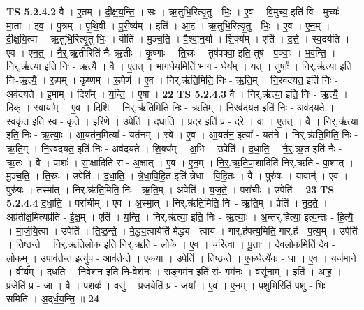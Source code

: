 \documentclass[17pt]{extarticle}
\begin{document}
                  \newline
                                \textbf{ TS 5.2.4.2} \newline
                  वै । ए॒तम् । दी॒क्ष॒य॒न्ति॒ । सः । ऋ॒तुभि॒रित्यृ॒तु - भिः॒ । ए॒व । वि॒मुच्य॒ इति॑ वि - मुच्यः॑ । मा॒ता । इ॒व॒ । पु॒त्रम् । पृ॒थि॒वी । पु॒री॒ष्य᳚म् । इति॑ । आ॒ह॒ । ऋ॒तुभि॒रित्यृ॒तु - भिः॒ । ए॒व । ए॒न॒म् । दी॒क्ष॒यि॒त्वा । ऋ॒तुभि॒रित्यृ॒तु-भिः॒ । वीति॑ । मु॒ञ्च॒ति॒ । वै॒श्वा॒न॒र्या । शि॒क्य᳚म् । एति॑ । द॒त्ते॒ । स्व॒दय॑ति । ए॒व । ए॒न॒त्॒ । नै॒र्॒.ऋ॒तीरिति॑ नैः-ऋ॒तीः । कृ॒ष्णाः । ति॒स्रः । तुष॑पक्वा॒ इति॒ तुष॑ - प॒क्वाः॒ । भ॒व॒न्ति॒ । निर्.ऋ॑त्या॒ इति॒ निः - ऋ॒त्यै॒ । वै । ए॒तत् । भा॒ग॒धेय॒मिति॑ भाग - धेय᳚म् । यत् । तुषाः᳚ । निर्.ऋ॑त्या॒ इति॒ निः-ऋ॒त्यै॒ । रू॒पम् । कृ॒ष्णम् । रू॒पेण॑ । ए॒व । निर्.ऋ॑ति॒मिति॒ निः - ऋ॒ति॒म् । नि॒रव॑दयत॒ इति॑ निः - अव॑दयते । इ॒माम् । दिश᳚म् । य॒न्ति॒ । ए॒षा । \textbf{  22} \newline
                  \newline
                                \textbf{ TS 5.2.4.3} \newline
                  वै । निर्.ऋ॑त्या॒ इति॒ निः - ऋ॒त्यै॒ । दिक् । स्वाया᳚म् । ए॒व । दि॒शि । निर्.ऋ॑ति॒मिति॒ निः - ऋ॒ति॒म् । नि॒रव॑दयत॒ इति॑ निः - अव॑दयते । स्वकृ॑त॒ इति॒ स्व - कृ॒ते॒ । इरि॑णे । उपेति॑ । द॒धा॒ति॒ । प्र॒द॒र इति॑ प्र - द॒रे । वा॒ । ए॒तत् । वै । निर्.ऋ॑त्या॒ इति॒ निः - ऋ॒त्याः॒ । आ॒यत॑न॒मित्या᳚ - यत॑नम् । स्वे । ए॒व । आ॒यत॑न॒ इत्या᳚ - यत॑ने । निर्.ऋ॑ति॒मिति॒ निः - ऋ॒ति॒म् । नि॒रव॑दयत॒ इति॑ निः - अव॑दयते । शि॒क्य᳚म् । अ॒भि । उपेति॑ । द॒धा॒ति॒ । नै॒र्॒.ऋ॒त इति॑ नैः - ऋ॒तः । वै । पाशः॑ । सा॒क्षादिति॑ स - अ॒क्षात् । ए॒व । ए॒न॒म् । नि॒र्॒.ऋ॒ति॒पा॒शादिति॑ निर्.ऋति - पा॒शात् । मु॒ञ्च॒ति॒ । ति॒स्रः । उपेति॑ । द॒धा॒ति॒ । त्रे॒धा॒वि॒हि॒त इति॑ त्रेधा - वि॒हि॒तः । वै । पुरु॑षः । यावान्॑ । ए॒व । पुरु॑षः । तस्मा᳚त् । निर्.ऋ॑ति॒मिति॒ निः - ऋ॒ति॒म् । अवेति॑ । य॒ज॒ते॒ । परा॑चीः । उपेति॑ । \textbf{  23} \newline
                  \newline
                                \textbf{ TS 5.2.4.4} \newline
                  द॒धा॒ति॒ । परा॑चीम् । ए॒व । अ॒स्मा॒त् । निर्.ऋ॑ति॒मिति॒ निः - ऋ॒ति॒म् । प्रेति॑ । नु॒द॒ते॒ । अप्र॑तीक्ष॒मित्यप्र॑ति - ई॒क्ष॒म् । एति॑ । य॒न्ति॒ । निर्.ऋ॑त्या॒ इति॒ निः - ऋ॒त्याः॒ । अ॒न्तर्.हि॑त्या॒ इत्य॒न्तः - हि॒त्यै॒ । मा॒र्ज॒यि॒त्वा । उपेति॑ । ति॒ष्ठ॒न्ते॒ । मे॒द्ध्य॒त्वायेति॑ मेद्ध्य - त्वाय॑ । गार्.ह॑पत्य॒मिति॒ गार्.ह॑ - प॒त्य॒म् । उपेति॑ । ति॒ष्ठ॒न्ते॒ । नि॒र्॒.ऋ॒ति॒लो॒क इति॑ निर्.ऋति - लो॒के । ए॒व । च॒रि॒त्वा । पू॒ताः । दे॒व॒लो॒कमिति॑ देव -  लो॒कम् । उ॒पाव॑र्तन्त॒ इत्यु॑प - आव॑र्तन्ते । एक॑या । उपेति॑ । ति॒ष्ठ॒न्ते॒ । ए॒क॒धेत्ये॑क - धा । ए॒व । यज॑माने । वी॒र्य᳚म् । द॒ध॒ति॒ । नि॒वेश॑न॒ इति॑ नि-वेश॑नः । स॒ङ्गम॑न॒ इति॑ सं- गम॑नः । वसू॑नाम् । इति॑ । आ॒ह॒ । प्र॒जेति॑ प्र - जा । वै ।   प॒शवः॑ । वसु॑ । प्र॒जयेति॑ प्र - जया᳚ । ए॒व । ए॒न॒म् । प॒शुभि॒रिति॑ प॒शु - भिः॒ । समिति॑ । अ॒द्‌र्ध॒य॒न्ति॒ ॥ \textbf{  24} \newline
\end{document}
